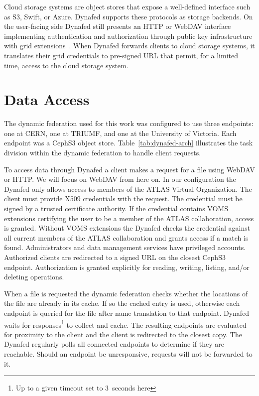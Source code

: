 \documentclass[a4paper]{jpconf}
\begin{document}
Cloud storage systems are object stores that expose a well-defined interface such as S3, Swift, or Azure. Dynafed supports these protocols as storage backends. On the user-facing side Dynafed still presents an HTTP or WebDAV interface implementing authentication and authorization through public key infrastructure with grid extensions~\cite{voms}. When Dynafed forwards clients to cloud storage systems, it translates their grid credentials to pre-signed URL that permit, for a limited time, access to the cloud storage system.

\section{Data Access}
The dynamic federation used for this work was configured to use three endpoints: one at CERN, one at TRIUMF, and one at the University of Victoria. Each endpoint was a CephS3 object store. Table~\ref{tab:dynafed-arch} illustrates the task division within the dynamic federation to handle client requests.

To access data through Dynafed a client makes a request for a file using WebDAV or HTTP.
We will focus on WebDAV from here on. In our configuration the Dynafed only allows access to members of the ATLAS Virtual Organization. The client must provide X509 credentials with the request. The credential must be signed by a trusted certificate authority. If the credential contains VOMS extensions certifying the user to be a member of the ATLAS collaboration, access is granted. Without VOMS extensions the Dynafed checks the credential against all current members of the ATLAS collaboration and grants access if a match is found. Administrators and data management services have privileged accounts. Authorized clients are redirected to a signed URL on the closest CephS3 endpoint. Authorization is granted explicitly for reading, writing, listing, and/or deleting operations.

When a file is requested the dynamic federation checks whether the locations of the file are already in its cache. If so the cached entry is used, otherwise each endpoint is queried for the file after name translation to that endpoint. Dynafed waits for responses\footnote{Up to a given timeout set to 3~seconds here} to collect and cache. The resulting endpoints are evaluated for proximity to the client and the client is redirected to the closest copy. The Dynafed regularly polls all connected endpoints to determine if they are reachable. Should an endpoint be unresponsive, requests will not be forwarded to it.
\end{document}
